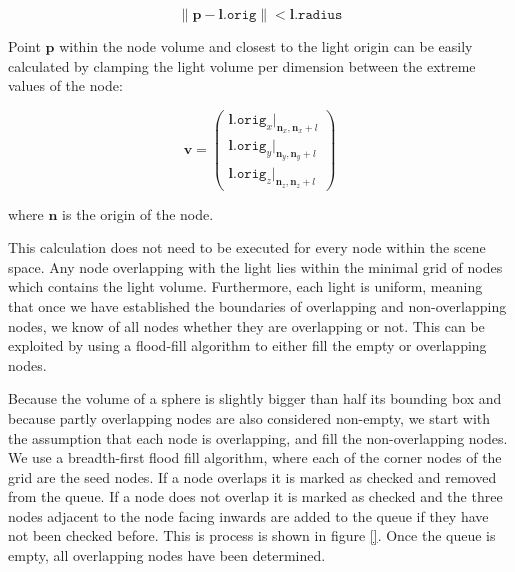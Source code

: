 \begin{equation*}
  \left\lVert \mathbf{p} - \mathbf{l}\mathtt{.orig} \right\rVert < \mathbf{l}\mathtt{.radius}
\end{equation*}

\noindent Point $\mathbf{p}$ within the node volume and closest to the light origin can be easily
calculated by clamping the light volume per dimension between the extreme values of the node:

\begin{equation*}
  \mathbf{v} = \begin{pmatrix} \mathbf{l}.\mathtt{orig}_x \vert_{\mathbf{n}_{x}, \mathbf{n}_{x} + \mathit{l}} \\
                               \mathbf{l}.\mathtt{orig}_y \vert_{\mathbf{n}_{y}, \mathbf{n}_{y} + \mathit{l}} \\
                               \mathbf{l}.\mathtt{orig}_z \vert_{\mathbf{n}_{z}, \mathbf{n}_{z} + \mathit{l}} 
\end{pmatrix} 
\end{equation*}

\noindent where $\mathbf{n}$ is the origin of the node.

This calculation does not need to be executed for every node within the scene space.
Any node overlapping with the light lies within the minimal grid of nodes which contains the light volume.
Furthermore, each light is uniform, meaning that once we have established the boundaries of overlapping
and non-overlapping nodes, we know of all nodes whether they are overlapping or not.
This can be exploited by using a flood-fill algorithm to either fill the empty or overlapping nodes.

Because the volume of a sphere is slightly bigger than half its bounding box and because partly
overlapping nodes are also considered non-empty, we start with the assumption that each node
is overlapping, and fill the non-overlapping nodes. We use a breadth-first flood fill algorithm,
where each of the corner nodes of the grid are the seed nodes. If a node overlaps it is marked as
checked and removed from the queue. If a node does not overlap it is marked as checked and the
three nodes adjacent to the node facing inwards are added to the queue if they have not been checked
before. This is process is shown in figure \ref{}.
Once the queue is empty, all overlapping nodes have been determined.



